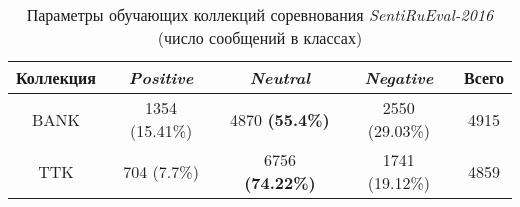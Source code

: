 \begin{table}[!ht]
\centering
\caption{Параметры обучающих коллекций соревнования {\it SentiRuEval-2016} (число сообщений в классах)}
\label{table:train2015balanced}
\begin{tabular}{|c|c|c|c|c|}
\hline
Коллекция & \textit{Positive} & \textit{Neutral}       & \textit{Negative} & Всего \\ \hline
BANK      & 1354 (15.41\%)    & 4870 {\bf (55.4\%)}    & 2550 (29.03\%)    & 4915  \\ \hline
TTK       & 704 (7.7\%)       & 6756 {\bf (74.22\%)}   & 1741 (19.12\%)    & 4859  \\ \hline
\end{tabular}
\end{table}
